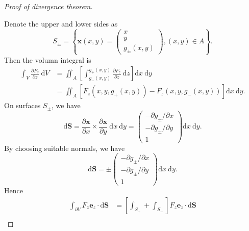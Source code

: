 \begin{proof}[Proof of divergence theorem]
\begin{center}
    \end{center}
    Denote the upper and lower sides as 
    \[
        S_{\pm}=\left\{\mathbf{x}(x, y)=\begin{pmatrix}
            x \\
            y \\
            g_{\pm}(x, y)
        \end{pmatrix},(x, y) \in A\right\}.
    \]
    Then the volumn integral is 
    \begin{align*}
        \int_{V} \frac{\partial F_{z}}{\partial z} \mathrm{~d} V &=\iint_{A}\left[\int_{g_{-}(x, y)}^{g_{+}(x, y)} \frac{\partial F_{z}}{\partial z} \mathrm{~d} z\right] \mathrm{d} x \mathrm{~d} y \\
        &=\iint_{A}\left[F_{z}\left(x, y, g_{+}(x, y)\right)-F_{z}\left(x, y, g_{-}(x, y)\right)\right] \mathrm{d} x \mathrm{~d} y .\tag{$*$}
    \end{align*}
    On surfaces $ S_{\pm} $, we have 
    \[
        \mathrm{d} \mathbf{S}=\frac{\partial \mathbf{x}}{\partial x} \times \frac{\partial \mathbf{x}}{\partial y} \mathrm{~d} x \mathrm{~d} y=\begin{pmatrix}
            -\partial g_{\pm} / \partial x \\
            -\partial g_{\pm} / \partial y \\
            1 
        \end{pmatrix} \mathrm{d} x \mathrm{~d} y.
    \]
    By choosing suitable normals, we have
    \[
        \mathrm{d} \mathbf{S}=\pm\begin{pmatrix}
            -\partial g_{\pm} / \partial x \\
            -\partial g_{\pm} / \partial y \\
            1
        \end{pmatrix} \mathrm{d} x \mathrm{~d} y.
    \]
    Hence 
    \begin{align*}
        \int_{\partial V} F_{z} \mathbf{e}_{z} \cdot \mathrm{d} \mathbf{S} &=\left[\int_{S_{+}}+\int_{S_{-}}\right] F_{z} \mathbf{e}_{z} \cdot \mathrm{d} \mathbf{S} \\

\end{align*}
\end{proof}
